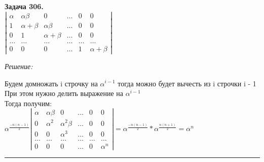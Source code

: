 \documentclass[a4paper, 12pt]{article}
\newenvironment{problem}[2][Задача]
    { \begin{mdframed}[backgroundcolor=gray!10] \textbf{#1 #2.} \\}
    {  \end{mdframed}}
\newenvironment{solution}
    {\textit{Решение: }}
    {\noindent\rule{7in}{1.5pt}}
\begin{document}
\begin{problem}{306}
$\left| \begin{array}{cccccc}\alpha & \alpha\beta & 0 & \ldots & 0 & 0 \\ 1 & \alpha+\beta & \alpha\beta & \ldots & 0 &  0 \\ 0 & 1 & \alpha+\beta & \ldots & 0 & 0 \\ \ldots & \ldots & \ldots & \ldots & \ldots & \ldots \\ 0 & 0 & 0 & \ldots & 1 & \alpha+\beta \end{array} \right|$
\end{problem}
\begin{solution}


Будем домножать i строчку на $\alpha^{i - 1}$
тогда можно будет вычесть из i строчки i - 1 \\
При этом нужно делить выражение на $\alpha^{i - 1}$ \\
Тогда получим: \\
$
\alpha^{\frac{-n(n - 1)}{2}}
\left|
\begin{array}{cccccc}
\alpha & \alpha\beta & 0 & \ldots & 0 & 0 \\
0 & \alpha^2 & \alpha^2\beta & \ldots & 0 &  0 \\
0 & 0 & \alpha^3 & \ldots & 0 & 0 \\
\ldots & \ldots & \ldots & \ldots & \ldots & \ldots \\
0 & 0 & 0 & \ldots & 0 & \alpha^n
\end{array}
\right|
=
\alpha^{\frac{-n(n - 1)}{2}} *
\alpha^{\frac{n(n + 1)}{2}}
=
\alpha^{n}
$

\end{solution}


\end{document}
